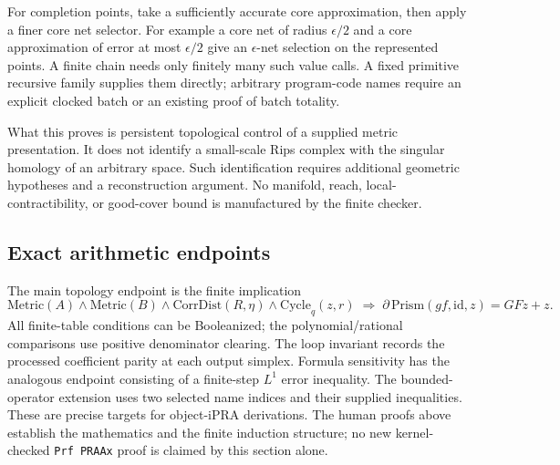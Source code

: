 For completion points, take a sufficiently accurate core approximation,
then apply a finer core net selector. For example a core net of radius
$\epsilon/2$ and a core approximation of error at most $\epsilon/2$ give
an $\epsilon$-net selection on the represented points. A finite chain needs
only finitely many such value calls. A fixed primitive recursive family
supplies them directly; arbitrary program-code names require an explicit
clocked batch or an existing proof of batch totality.

What this proves is persistent topological control of a supplied metric
presentation. It does not identify a small-scale Rips complex with the
singular homology of an arbitrary space. Such identification requires
additional geometric hypotheses and a reconstruction argument. No
manifold, reach, local-contractibility, or good-cover bound is manufactured
by the finite checker.

\subsection{Exact arithmetic endpoints}

The main topology endpoint is the finite implication
\[
 \mathrm{Metric}(A)\wedge\mathrm{Metric}(B)\wedge
 \mathrm{CorrDist}(R,\eta)\wedge\mathrm{Cycle}_q(z,r)
 \;\Longrightarrow\;
 \partial\,\mathrm{Prism}(g f,\mathrm{id},z)=GFz+z.
\]
All finite-table conditions can be Booleanized; the polynomial/rational
comparisons use positive denominator clearing. The loop invariant records
the processed coefficient parity at each output simplex. Formula
sensitivity has the analogous endpoint consisting of a finite-step
$L^1$ error inequality. The bounded-operator extension uses two selected
name indices and their supplied inequalities. These are precise targets
for object-iPRA derivations. The human proofs above establish the
mathematics and the finite induction structure; no new kernel-checked
\texttt{Prf PRAAx} proof is claimed by this section alone.
